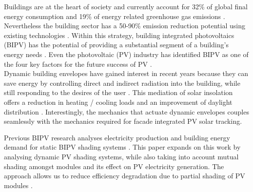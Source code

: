 
Buildings are at the heart of society and currently account for 32\% of global final energy consumption and 19\% of energy related greenhouse gas emissions \cite{IPCC}. Nevertheless the building sector has a 50-90\% emission reduction potential using existing technologies \cite{IPCC}. Within this strategy, building integrated photovoltaics (BIPV) has the potential of providing a substantial segment of a building's energy needs \cite{defaix2012technical}. Even the photovoltaic (PV) industry has identified BIPV as one of the four key factors for the future success of PV \cite{raugei2009life}. \\



Dynamic building envelopes have gained interest in recent years because they can save energy by controlling direct and indirect radiation into the building, while still responding to the desires of the user \cite{loonen2013climate}. This mediation of solar insolation offers a reduction in heating / cooling loads and an improvement of daylight distribution \cite{rossi2012adaptive}. Interestingly, the mechanics that actuate dynamic envelopes couples seamlessly with the mechanics required for facade integrated PV solar tracking. 

Previous BIPV research analyses electricity production and building energy demand for static BIPV shading systems \cite{mandalaki2012assessment} \cite{yoo2011available} \cite{freitas2015maximizing} \cite{jayathissa2015abs}. This paper expands on this work by analysing dynamic PV shading systems, while also taking into account mutual shading amongst modules and its effect on PV electricity generation. The approach allows us to reduce efficiency degradation due to partial shading of PV modules \cite{hofer2015PVSEC}.%

